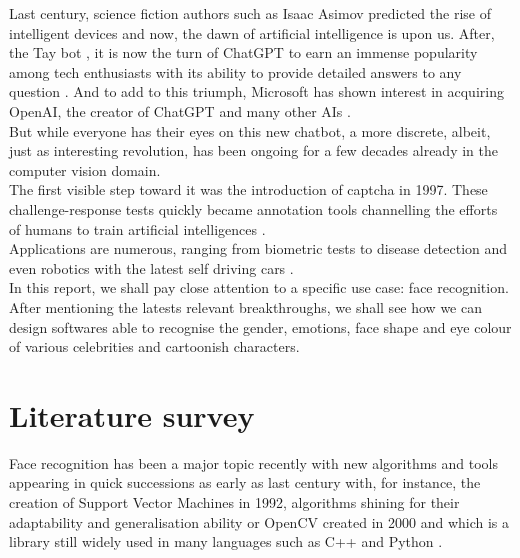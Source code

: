 \documentclass[a4paper,12pt,twoside,twocolumn]{article}
\begin{document}
Last century, science fiction authors such as Isaac Asimov predicted the rise of intelligent devices \autocite{asimov_akinyemi_2000} \autocite{ai_eco_impact} and now, the dawn of artificial intelligence is upon us. After, the Tay bot \autocite{tay}, it is now the turn of ChatGPT to earn an immense popularity among tech enthusiasts with its ability to provide detailed answers to any question \autocite{chatgpt-detect} \autocite{chatpgt-teach}. And to add to this triumph, Microsoft has shown interest in acquiring OpenAI, the creator of ChatGPT and many other AIs \autocite{microsoft_buy_openai}.\\

But while everyone has their eyes on this new chatbot, a more discrete, albeit, just as interesting revolution, has been ongoing for a few decades already in the computer vision domain.\\

The first visible step toward it was the introduction of captcha \autocite{captcha_original} in 1997. These challenge-response tests quickly became annotation tools channelling the efforts of humans to train artificial intelligences \autocite{captcha_recognition}.\\

Applications are numerous, ranging from biometric tests to disease detection \autocite{cv_cancer} and even robotics with the latest self driving cars \autocite{cv_robotics}.\\

In this report, we shall pay close attention to a specific use case: face recognition. After mentioning the latests relevant breakthroughs, we shall see how we can design softwares able to recognise the gender, emotions, face shape and eye colour of various celebrities and cartoonish characters.\\

\section{Literature survey}
\label{sec:orga3b40b8}
Face recognition has been a major topic recently with new algorithms and tools appearing in quick successions as early as last century with, for instance, the creation of Support Vector Machines in 1992, algorithms shining for their adaptability and generalisation ability  \autocite{face_recognition_svm} \autocite{app_svm} or OpenCV created in 2000 and which is a library still widely used in many languages such as C++ and Python \autocite{opencv_face_detect}.\\
\end{document}
